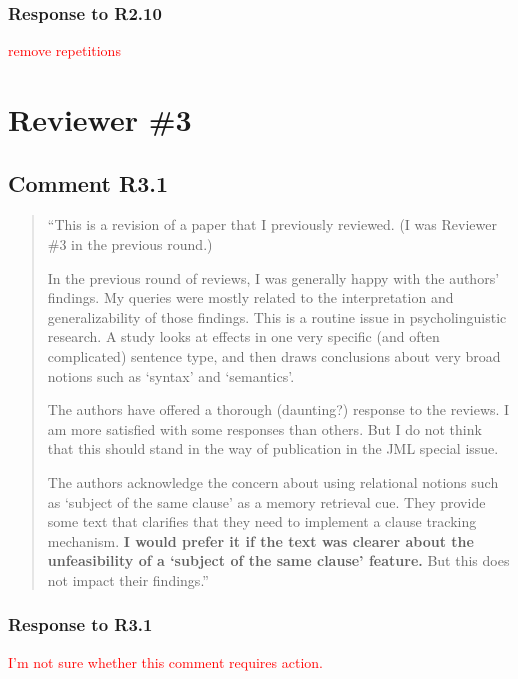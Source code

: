 \documentclass[12pt]{article}
\begin{document}
\subsubsection*{Response to R2.10}
\textcolor{red}{remove repetitions}


\section*{Reviewer \#3} 

\subsection*{Comment R3.1}
\begin{quote}
``This is a revision of a paper that I previously reviewed. (I was Reviewer \#3 in the previous round.)

In the previous round of reviews, I was generally happy with the authors' findings. My queries were mostly related to the interpretation and generalizability of those findings. This is a routine issue in psycholinguistic research. A study looks at effects in one very specific (and often complicated) sentence type, and then draws conclusions about very broad notions such as `syntax' and `semantics'.

The authors have offered a thorough (daunting?) response to the reviews. I am more satisfied with some responses than others. But I do not think that this should stand in the way of publication in the JML special issue.

The authors acknowledge the concern about using relational notions such as `subject of the same clause' as a memory retrieval cue. They provide some text that clarifies that they need to implement a clause tracking mechanism. \textbf{I would prefer it if the text was clearer about the unfeasibility of a `subject of the same clause' feature.} But this does not impact their findings.''
\end{quote}

\subsubsection*{Response to R3.1}
\textcolor{red}{I'm not sure whether this comment requires action.}
\end{document}
